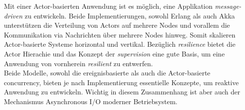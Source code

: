 Mit einer Actor-basierten Anwendung ist es möglich, eine Applikation \textit{message-driven} zu entwickeln. Beide Implementierungen, sowohl Erlang als auch Akka unterstützen die Verteilung von Actors auf mehrere Nodes und vorallem die Kommunikation via Nachrichten über mehrere Nodes hinweg. Somit skalieren Actor-basierte Systeme horizontal und vertikal. Bezüglich \textit{resilience} bietet die Actor Hierachie und das Konzept der \textit{supervision} eine gute Basis, um eine Anwendung von vornherein \textit{resilient} zu entwerfen.\\

Beide Modelle, sowohl die ereignisbasierte als auch die Actor-basierte \gls{concurrency}, bieten je nach Implementierung essentielle Konzepte, um reaktive Anwendung zu entwickeln. Wichtig in diesem Zusammenhang ist aber auch der Mechanismus Asynchronous I/O moderner Betriebsystem.
